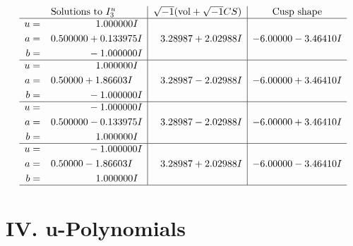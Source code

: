 \documentclass[1p]{elsarticle_modified}
\theoremstyle{definition}
\newcommand{\I}{\sqrt{-1}}
\begin{document}
$$\begin{array}{c|c|c}  
\text{Solutions to }I^u_{3}& \I (\text{vol} + \sqrt{-1}CS) & \text{Cusp shape}\\
 \hline 
\begin{aligned}
u &= \phantom{-0.000000 -}1.000000 I \\
a &= \phantom{-}0.500000 + 0.133975 I \\
b &= \phantom{-0.000000 } -1.000000 I\end{aligned}
 & \phantom{-}3.28987 + 2.02988 I & -6.00000 - 3.46410 I \\ \hline\begin{aligned}
u &= \phantom{-0.000000 -}1.000000 I \\
a &= \phantom{-}0.50000 + 1.86603 I \\
b &= \phantom{-0.000000 } -1.000000 I\end{aligned}
 & \phantom{-}3.28987 - 2.02988 I & -6.00000 + 3.46410 I \\ \hline\begin{aligned}
u &= \phantom{-0.000000 } -1.000000 I \\
a &= \phantom{-}0.500000 - 0.133975 I \\
b &= \phantom{-0.000000 -}1.000000 I\end{aligned}
 & \phantom{-}3.28987 - 2.02988 I & -6.00000 + 3.46410 I \\ \hline\begin{aligned}
u &= \phantom{-0.000000 } -1.000000 I \\
a &= \phantom{-}0.50000 - 1.86603 I \\
b &= \phantom{-0.000000 -}1.000000 I\end{aligned}
 & \phantom{-}3.28987 + 2.02988 I & -6.00000 - 3.46410 I\\
 \hline 
 \end{array}$$\newpage
\newpage\renewcommand{\arraystretch}{1}
\centering \section*{ IV. u-Polynomials}
\end{document}
